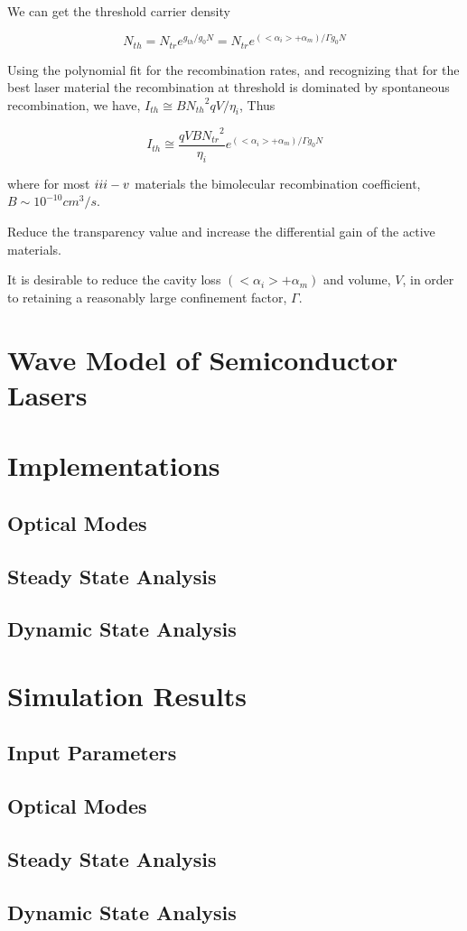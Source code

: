 We can get the threshold carrier density

\begin{equation}
  N_{th} = N_{tr}e^{g_{th}/g_{0}N} = N_{tr}e^{(<\alpha_i> + \alpha_m)/\Gamma{g_{0}}N}
\end{equation}

Using the polynomial fit for the recombination rates, and recognizing that for
the best laser material the recombination at threshold is dominated by
spontaneous recombination, we have, $I_{th}\cong B{N_{th}}^2qV/\eta_i$, Thus

\begin{equation}
  I_{th} {\cong} \frac{qVB{N_{tr}}^2}{\eta_i}e^{(<\alpha_i> + \alpha_m)/\Gamma{g_0}N}
\end{equation}

where for most $\uppercase\expandafter{\romannumeral3} -
\uppercase\expandafter{\romannumeral5}$ materials the bimolecular recombination
coefficient, $B \sim 10^{-10} cm^3/s$.

Reduce the transparency value and increase the differential gain of the active materials.

It is desirable to reduce the cavity loss $(<\alpha_i> + \alpha_m)$ and volume, $V$, in order to retaining a reasonably large confinement factor, $\Gamma$.
\section{Wave Model of Semiconductor Lasers} \label{corrections}

\section{Implementations} \label{corrections}
\subsection{Optical Modes}
\subsection{Steady State Analysis}
\subsection{Dynamic State Analysis}

\section{Simulation Results} \label{corrections}
\subsection{Input Parameters}
\subsection{Optical Modes}
\subsection{Steady State Analysis}
\subsection{Dynamic State Analysis}
